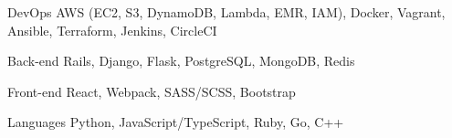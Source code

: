 

\begin{cvskills}

  \cvskill
    {DevOps} %
    {AWS (EC2, S3, DynamoDB, Lambda, EMR, IAM), Docker, Vagrant, Ansible, Terraform, Jenkins, CircleCI}

  \cvskill
    {Back-end} %
    {Rails, Django, Flask, PostgreSQL, MongoDB, Redis}

  \cvskill
    {Front-end} %
    {React, Webpack, SASS/SCSS, Bootstrap}

  \cvskill
    {Languages} %
    {Python, JavaScript/TypeScript, Ruby, Go, C++}

\end{cvskills}
